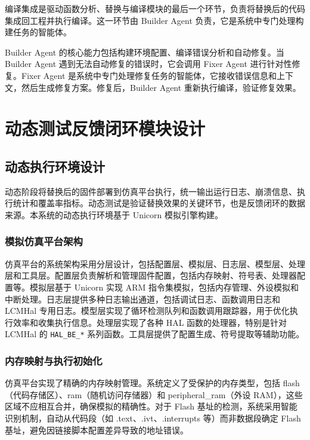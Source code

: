编译集成是驱动函数分析、替换与编译模块的最后一个环节，负责将替换后的代码集成回工程并执行编译。这一环节由 Builder Agent 负责，它是系统中专门处理构建任务的智能体。

Builder Agent 的核心能力包括构建环境配置、编译错误分析和自动修复。当 Builder Agent 遇到无法自动修复的错误时，它会调用 Fixer Agent 进行针对性修复。Fixer Agent 是系统中专门处理修复任务的智能体，它接收错误信息和上下文，然后生成修复方案。修复后，Builder Agent 重新执行编译，验证修复效果。

\section{动态测试反馈闭环模块设计}
\label{sec:feedback}

\subsection{动态执行环境设计}

动态阶段将替换后的固件部署到仿真平台执行，统一输出运行日志、崩溃信息、执行统计和覆盖率指标。动态测试是验证替换效果的关键环节，也是反馈闭环的数据来源。本系统的动态执行环境基于 Unicorn 模拟引擎构建。

\subsubsection{模拟仿真平台架构}

仿真平台的系统架构采用分层设计，包括配置层、模拟层、日志层、模型层、处理层和工具层。配置层负责解析和管理固件配置，包括内存映射、符号表、处理器配置等。模拟层基于 Unicorn 实现 ARM 指令集模拟，包括内存管理、外设模拟和中断处理。日志层提供多种日志输出通道，包括调试日志、函数调用日志和 LCMHal 专用日志。模型层实现了循环检测队列和函数调用跟踪器，用于优化执行效率和收集执行信息。处理层实现了各种 HAL 函数的处理器，特别是针对 LCMHal 的 \texttt{HAL\_BE\_*} 系列函数。工具层提供了配置生成、符号提取等辅助功能。

\subsubsection{内存映射与执行初始化}

仿真平台实现了精确的内存映射管理。系统定义了受保护的内存类型，包括 flash（代码存储区）、ram（随机访问存储器）和 peripheral\_ram（外设 RAM），这些区域不应相互合并，确保模拟的精确性。对于 Flash 基址的检测，系统采用智能识别机制，自动从代码段（如 .text、.ivt、.interrupts 等）而非数据段确定 Flash 基址，避免因链接脚本配置差异导致的地址错误。

